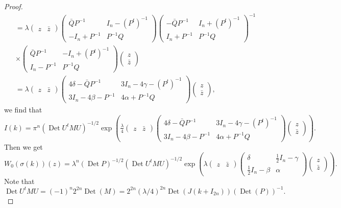 \documentclass[12pt]{amsart}
\numberwithin{equation}{section}
\DeclareMathOperator{\Det}{Det} \DeclareMathOperator{\Tr}{Tr}
\begin{document}
\begin{proof}
\begin{align*}
&=\lambda \begin{pmatrix}z&{\bar z}\end{pmatrix}\begin{pmatrix}{\bar Q}P^{-1} &I_n-(P^t)^{-1}\\
-I_n+P^{-1}&P^{-1}Q \end{pmatrix}\begin{pmatrix}-{\bar Q}P^{-1} &I_n+(P^t)^{-1}\\
I_n+P^{-1}&P^{-1}Q \end{pmatrix}^{-1}\\
&\times \begin{pmatrix}{\bar Q}P^{-1} &-I_n+(P^t)^{-1}\\
I_n-P^{-1}&P^{-1}Q \end{pmatrix}
\begin{pmatrix}z\\{\bar z}\end{pmatrix}\\
&=\lambda \begin{pmatrix}z&{\bar z}\end{pmatrix}\begin{pmatrix}4\delta-{\bar Q}P^{-1} &3I_n-4\gamma-(P^t)^{-1}\\
3I_n-4\beta -P^{-1}&4\alpha+P^{-1}Q \end{pmatrix}\begin{pmatrix}z\\{\bar z}\end{pmatrix},
\end{align*}  we find that
\begin{equation*}I(k)=\pi^n(\Det U^tMU)^{-1/2}\exp \left(\tfrac{\lambda}{4}
\begin{pmatrix}z&{\bar z}\end{pmatrix}\begin{pmatrix}4\delta-{\bar Q}P^{-1} &3I_n-4\gamma-(P^t)^{-1}\\
3I_n-4\beta -P^{-1}&4\alpha+P^{-1}Q \end{pmatrix}\begin{pmatrix}z\\{\bar z}\end{pmatrix}\right).\end{equation*}
Then we get
\begin{equation*}W_0(\sigma(k))(z)={\lambda}^n(\Det P)^{-1/2}(\Det U^tMU)^{-1/2}
\exp \left(\lambda \begin{pmatrix}z&{\bar z}\end{pmatrix}\begin{pmatrix}\delta &\tfrac{1}{2}I_n-\gamma\\
\tfrac{1}{2}I_n-\beta &\alpha \end{pmatrix}\begin{pmatrix}z\\{\bar z}\end{pmatrix}
\right). \end{equation*}
Note that 
\begin{equation*}\Det U^tMU=(-1)^n2^{2n}\Det(M)=2^{2n}(\lambda/4)^{2n}\Det(J(k+I_
{2n}))(\Det (P))^{-1}.\end{equation*}


\end{proof}
\end{document}
